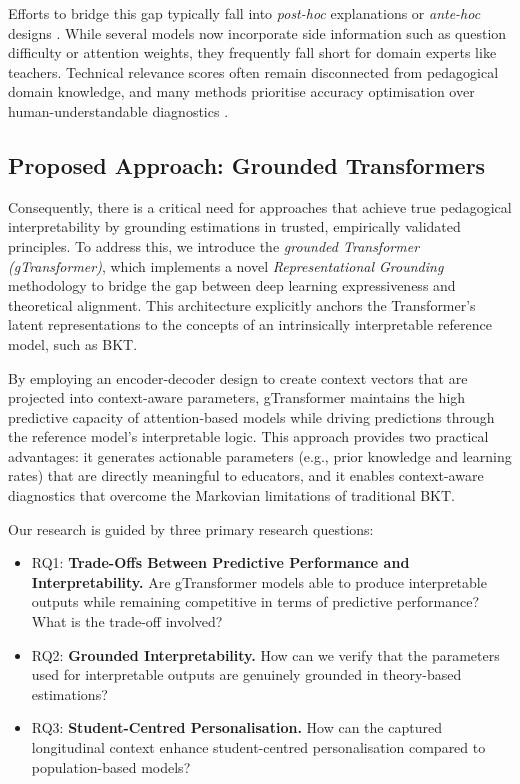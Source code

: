 \documentclass[applsci,article,submit,moreauthors,pdftex]{Definitions/mdpi}
\begin{document}
Efforts to bridge this gap typically fall into \textit{post-hoc} explanations or \textit{ante-hoc} designs \citep{bai2024survey}. While several models now incorporate side information such as question difficulty or attention weights, they frequently fall short for domain experts like teachers. Technical relevance scores often remain disconnected from pedagogical domain knowledge, and many methods prioritise accuracy optimisation over human-understandable diagnostics \citep{rudin2019stop, vonrueden2021informed}.

\subsection{Proposed Approach: Grounded Transformers}

Consequently, there is a critical need for approaches that achieve true pedagogical interpretability by grounding estimations in trusted, empirically validated principles. To address this, we introduce the \textit{grounded Transformer (gTransformer)}, which implements a novel \textit{Representational Grounding} methodology to bridge the gap between deep learning expressiveness and theoretical alignment. This architecture explicitly anchors the Transformer’s latent representations to the concepts of an intrinsically interpretable reference model, such as BKT. 

By employing an encoder-decoder design to create context vectors that are projected into context-aware parameters, gTransformer maintains the high predictive capacity of attention-based models while driving predictions through the reference model's interpretable logic. This approach provides two practical advantages: it generates actionable parameters (e.g., prior knowledge and learning rates) that are directly meaningful to educators, and it enables context-aware diagnostics that overcome the Markovian limitations of traditional BKT. 

Our research is guided by three primary research questions:

\begin{itemize}
\item RQ1: \textbf{Trade-Offs Between Predictive Performance and Interpretability.}
Are gTransformer models able to produce interpretable outputs while remaining competitive in terms of predictive performance? What is the trade-off involved?

\item RQ2: \textbf{Grounded Interpretability.}
How can we verify that the parameters used for interpretable outputs are genuinely grounded in theory-based estimations?  

\item RQ3: \textbf{Student-Centred Personalisation.}
How can the captured longitudinal context enhance student-centred personalisation compared to population-based models?
\end{itemize} \label{sec_rq}
\end{document}
